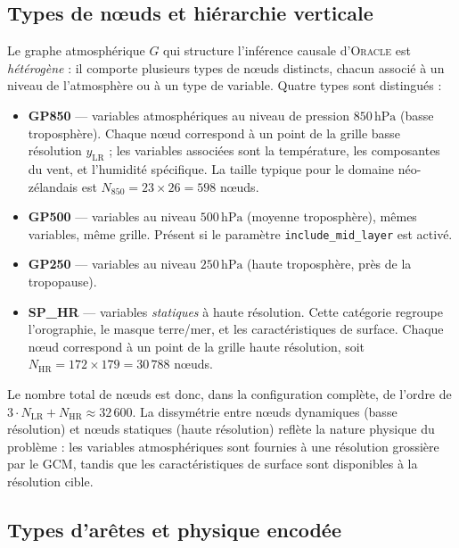 \documentclass[14pt,a4paper,openany]{extreport}
\theoremstyle{definition}
\newcommand{\Oracle}{\textsc{Oracle}}
\newcommand{\LR}{\ensuremath{\text{LR}}}
\newcommand{\HR}{\ensuremath{\text{HR}}}
\newcommand{\yLR}{\ensuremath{y_{\LR}}}
\begin{document}
\subsection{Types de nœuds et hiérarchie verticale}
\label{ssec:oracle-types-noeuds}

Le graphe atmosphérique $G$ qui structure l'inférence causale d'\Oracle{} est \emph{hétérogène} : il comporte plusieurs types de nœuds distincts, chacun associé à un niveau de l'atmosphère ou à un type de variable. Quatre types sont distingués :
\begin{itemize}
  \item \textbf{GP850} --- variables atmosphériques au niveau de pression $850\,\mathrm{hPa}$ (basse troposphère). Chaque nœud correspond à un point de la grille basse résolution $\yLR$ ; les variables associées sont la température, les composantes du vent, et l'humidité spécifique. La taille typique pour le domaine néo-zélandais est $N_{850} = 23 \times 26 = 598$ nœuds.
  \item \textbf{GP500} --- variables au niveau $500\,\mathrm{hPa}$ (moyenne troposphère), mêmes variables, même grille. Présent si le paramètre \texttt{include\_mid\_layer} est activé.
  \item \textbf{GP250} --- variables au niveau $250\,\mathrm{hPa}$ (haute troposphère, près de la tropopause).
  \item \textbf{SP\_HR} --- variables \emph{statiques} à haute résolution. Cette catégorie regroupe l'orographie, le masque terre/mer, et les caractéristiques de surface. Chaque nœud correspond à un point de la grille haute résolution, soit $N_{\HR} = 172 \times 179 = 30\,788$ nœuds.
\end{itemize}

Le nombre total de nœuds est donc, dans la configuration complète, de l'ordre de $3 \cdot N_{\LR} + N_{\HR} \approx 32\,600$. La dissymétrie entre nœuds dynamiques (basse résolution) et nœuds statiques (haute résolution) reflète la nature physique du problème : les variables atmosphériques sont fournies à une résolution grossière par le GCM, tandis que les caractéristiques de surface sont disponibles à la résolution cible.

\subsection{Types d'arêtes et physique encodée}
\label{ssec:oracle-types-aretes}
\end{document}
